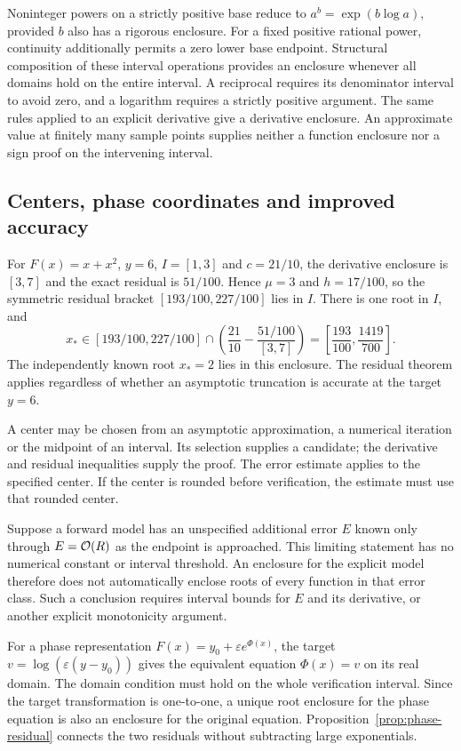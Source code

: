 Noninteger powers on a strictly positive base reduce to
$a^b=\exp(b\log a)$, provided $b$ also has a rigorous enclosure.
For a fixed positive rational power, continuity additionally permits a zero
lower base endpoint. Structural composition of these interval operations
provides an enclosure whenever all domains hold on the entire interval.
A reciprocal requires its denominator interval to avoid zero, and a
logarithm requires a strictly positive argument. The same rules applied to
an explicit derivative give a derivative enclosure. An approximate value
at finitely many sample points supplies neither a function enclosure nor
a sign proof on the intervening interval.

\subsection{Centers, phase coordinates and improved accuracy}

\begin{example}
For $F(x)=x+x^2$, $y=6$, $I=[1,3]$ and $c=21/10$, the derivative enclosure
is $[3,7]$ and the exact residual is $51/100$. Hence $\mu=3$ and
$h=17/100$, so the symmetric residual bracket
$[193/100,227/100]$ lies in $I$. There is one root in $I$, and
\[
 x_*\in[193/100,227/100]\cap
 \left(\frac{21}{10}-\frac{51/100}{[3,7]}\right)
 =\left[\frac{193}{100},\frac{1419}{700}\right].
\]
The independently known root $x_*=2$ lies in this enclosure. The residual
theorem applies regardless of whether an asymptotic truncation is accurate
at the target $y=6$.
\end{example}

A center may be chosen from an asymptotic approximation, a numerical
iteration or the midpoint of an interval. Its selection supplies a
candidate; the derivative and residual inequalities supply the proof.
The error estimate applies to the specified center. If the center is
rounded before verification, the estimate must use that rounded center.

Suppose a forward model has an unspecified additional error $E$ known only
through $E=\mathcal O(R)$ as the endpoint is approached. This limiting statement
has no numerical constant or interval threshold. An enclosure for the
explicit model therefore does not automatically enclose roots of every
function in that error class. Such a conclusion requires interval bounds
for $E$ and its derivative, or another explicit monotonicity argument.

For a phase representation $F(x)=y_0+\varepsilon e^{\Phi(x)}$, the target
$v=\log(\varepsilon(y-y_0))$ gives the equivalent equation
$\Phi(x)=v$ on its real domain. The domain condition must hold on the whole
verification interval. Since the target transformation is one-to-one,
a unique root enclosure for the phase equation is also an enclosure for
the original equation. Proposition~\ref{prop:phase-residual} connects the
two residuals without subtracting large exponentials.


